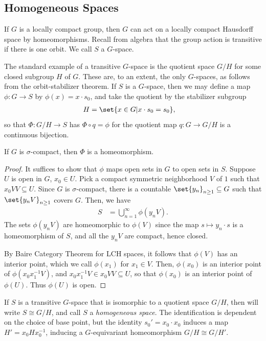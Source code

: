 \documentclass[12pt]{mypackage}
\begin{document}
\subsection{Homogeneous Spaces}%
If $G$ is a locally compact group, then $G$ can act on a locally compact Hausdorff space by homeomorphisms. Recall from algebra that the group action is transitive if there is one orbit. We call $S$ a $G$-space.

The standard example of a transitive $G$-space is the quotient space $G/H$ for some closed subgroup $H$ of $G$. These are, to an extent, the only $G$-spaces, as follows from the orbit-stabilizer theorem. If $S$ is a $G$-space, then we may define a map $\phi\colon G\rightarrow S$ by $\phi(x) = x\cdot s_0$, and take the quotient by the stabilizer subgroup
\begin{align*}
  H &= \set{x\in G | x\cdot s_0 = s_0},
\end{align*}
so that $\Phi\colon G/H\rightarrow S$ has $\Phi\circ q = \phi$ for the quotient map $q\colon G\rightarrow G/H$ is a continuous bijection.
\begin{proposition}
  If $G$ is $\sigma$-compact, then $\Phi$ is a homeomorphism. 
\end{proposition}
\begin{proof}
  It suffices to show that $\phi$ maps open sets in $G$ to open sets in $S$. Suppose $U$ is open in $G$, $x_0\in U$. Pick a compact symmetric neighborhood $V$ of $1$ such that $x_0VV\subseteq U$. Since $G$ is $\sigma$-compact, there is a countable $\set{y_n}_{n\geq 1}\subseteq G$ such that $\set{y_nV}_{n\geq 1}$ covers $G$. Then, we have
  \begin{align*}
    S &= \bigcup_{n=1}^{\infty} \phi\left( y_nV \right).
  \end{align*}
  The sets $\phi\left( y_nV \right)$ are homeomorphic to $\phi(V)$ since the map $s\mapsto y_n\cdot s$ is a homeomorphism of $S$, and all the $y_nV$ are compact, hence closed.

  By Baire Category Theorem for LCH spaces, it follows that $\phi(V)$ has an interior point, which we call $\phi\left(x_1\right)$ for $x_1\in V$. Then, $\phi\left(x_0\right)$ is an interior point of $\phi\left( x_0x_1^{-1}V \right)$, and $x_0x_1^{-1}V\in x_0VV\subseteq U$, so that $\phi\left(x_0\right)$ is an interior point of $\phi(U)$. Thus $\phi(U)$ is open.
\end{proof}
If $S$ is a transitive $G$-space that is isomorphic to a quotient space $G/H$, then will write $S\cong G/H$, and call $S$ a \textit{homogeneous space}. The identification is dependent on the choice of base point, but the identity $s_0' = x_0\cdot x_0$ induces a map $H' = x_0 H x_0^{-1}$, inducing a $G$-equivariant homeomorphism $G/H\cong G/H'$.
\end{document}
